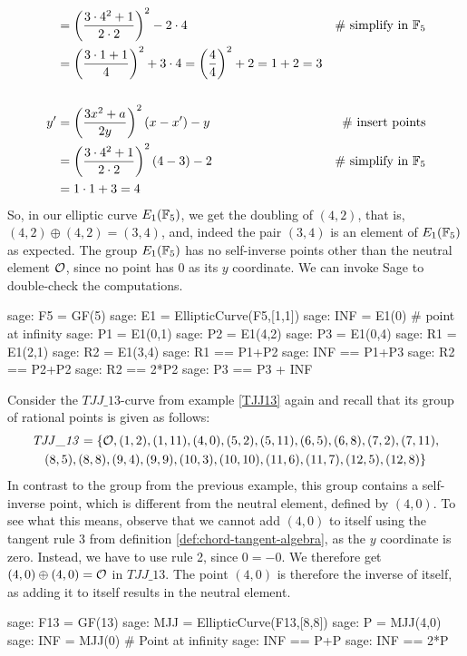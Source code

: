 \begin{example}
\begin{align*}
    & = \left(\frac{3\cdot 4^2+1}{2\cdot 2}\right)^2 -2\cdot 4 & \text{\# simplify in } \mathbb{F}_5 \\
    & = \left(\frac{3\cdot 1+1}{4}\right)^2 +3\cdot 4
      = \left(\frac{4}{4}\right)^2 +2
      = 1 +2 
      = 3
\\
\\
y'  & = \left(\frac{3x^2+a}{2y}\right)^2\left(x-x'\right) - y  & \text{\# insert points} \\
    & = \left(\frac{3\cdot 4^2+1}{2\cdot 2}\right)^2\left(4-3\right) - 2 & \text{\# simplify in } \mathbb{F}_5\\
    & = 1\cdot 1 + 3
      = 4
\end{align*}
So, in our elliptic curve $E_1(\mathbb{F}_5)$, we get the doubling  of $(4,2)$, that is, $(4,2)\oplus (4,2) =(3,4)$, and, indeed the pair $(3,4)$ is an element of $E_1(\mathbb{F}_5)$ as expected. The group $E_1(\mathbb{F}_5)$ has no self-inverse points other than the neutral element $\mathcal{O}$, since no point has $0$ as its $y$ coordinate. We can invoke Sage to double-check the computations. 
\begin{sagecommandline}
sage: F5 = GF(5)
sage: E1 = EllipticCurve(F5,[1,1])
sage: INF = E1(0) # point at infinity
sage: P1 = E1(0,1)
sage: P2 = E1(4,2)
sage: P3 = E1(0,4)
sage: R1 = E1(2,1)
sage: R2 = E1(3,4)
sage: R1 == P1+P2
sage: INF == P1+P3
sage: R2 == P2+P2
sage: R2 == 2*P2
sage: P3 == P3 + INF
\end{sagecommandline}
\end{example}
\begin{example}\label{ex:TJJ13-self-inverse} Consider the $\mathit{TJJ\_13}$-curve from example \ref{TJJ13} again and recall that its group of rational points is given as follows:
\begin{multline*}
\mathit{TJJ\_13} = \{\mathcal{O}, (1, 2), (1, 11), (4, 0), (5, 2), (5, 11), (6, 5), (6, 8), (7,2), (7, 11), \\ (8, 5), (8, 8), (9, 4), (9, 9), (10, 3), (10,
10), (11, 6), (11, 7), (12, 5), (12, 8)\}
\end{multline*}
In contrast to the group from the previous example, this group contains a self-inverse point, which is different from the neutral element, defined by $(4,0)$. To see what this means, observe that we cannot add $(4,0)$ to itself using the tangent rule 3 from definition \ref{def:chord-tangent-algebra}, as the $y$ coordinate is zero. Instead, we have to use rule 2, since $0=-0$. We therefore get $(4,0)\oplus (4,0)=\mathcal{O}$ in $\mathit{TJJ\_13}$. The point $(4,0)$ is therefore the inverse of itself, as adding it to itself results in the neutral element. 
\begin{sagecommandline}
sage: F13 = GF(13)
sage: MJJ = EllipticCurve(F13,[8,8])
sage: P = MJJ(4,0)
sage: INF = MJJ(0) # Point at infinity
sage: INF == P+P
sage: INF == 2*P
\end{sagecommandline}
\end{example}
